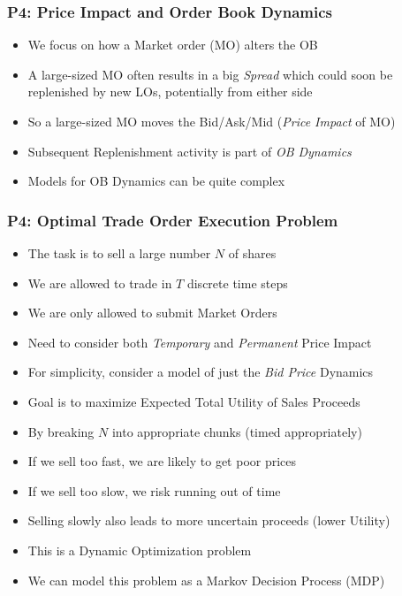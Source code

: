 \documentclass[handout]{beamer}
\begin{document}
\begin{frame}
\frametitle{P4: Price Impact and Order Book Dynamics}
\pause
\begin{itemize}[<+->]
\item We focus on how a Market order (MO) alters the OB
\item A large-sized MO often results in a big {\em Spread} which could soon be replenished by new LOs, potentially from either side
\item So a large-sized MO moves the Bid/Ask/Mid ({\em Price Impact} of MO)
\item Subsequent Replenishment activity is part of {\em OB Dynamics}
\item Models for OB Dynamics can be quite complex
\end{itemize}
\end{frame}

\begin{frame}
\frametitle{P4: Optimal Trade Order Execution Problem}
\pause
\begin{itemize}[<+->]
\item The task is to sell a large number $N$ of shares
\item We are allowed to trade in $T$ discrete time steps
\item We are only allowed to submit Market Orders
\item Need to consider both {\em Temporary} and {\em Permanent} Price Impact
\item For simplicity, consider a model of just the {\em Bid Price} Dynamics
\item Goal is to maximize Expected Total Utility of Sales Proceeds
\item By breaking $N$ into appropriate chunks (timed appropriately)
\item If we sell too fast, we are likely to get poor prices
\item If we sell too slow, we risk running out of time
\item Selling slowly also leads to more uncertain proceeds (lower Utility)
\item This is a Dynamic Optimization problem
\item We can model this problem as a Markov Decision Process (MDP)
\end{itemize}
\end{frame}
\end{document}
